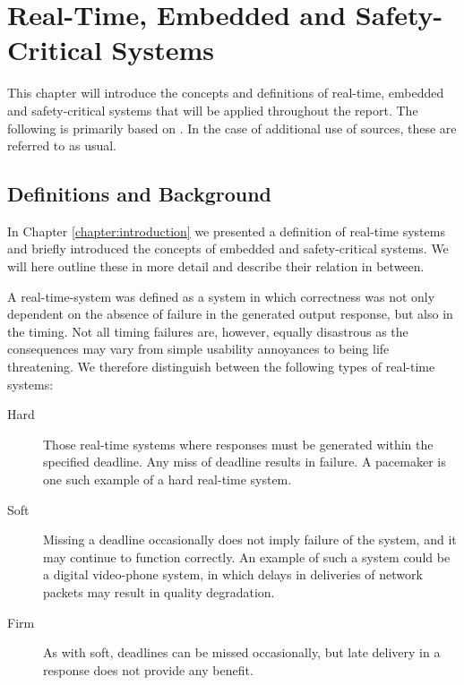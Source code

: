 \chapter{Real-Time, Embedded and Safety-Critical Systems}
\label{chapter:rts}
This chapter will introduce the concepts and definitions of real-time, embedded and safety-critical systems that will be applied throughout the report. The following is primarily based on \cite{alan2001real}. In the case of additional use of sources, these are referred to as usual.

\section{Definitions and Background} %
\label{sec:definitions_and_background}
In Chapter \ref{chapter:introduction} we presented a definition of real-time systems and briefly introduced the concepts of embedded and safety-critical systems. We will here outline these in more detail and describe their relation in between.

A real-time-system was defined as a system in which correctness was not only dependent on the absence of failure in the generated output response, but also in the timing. Not all timing failures are, however, equally disastrous as the consequences may vary from simple usability annoyances to being life threatening. We therefore distinguish between the following types of real-time systems:
\begin{description}
\item[Hard] Those real-time systems where responses must be generated within the specified deadline. Any miss of deadline results in failure. A pacemaker is one such example of a hard real-time system.
\item[Soft] Missing a deadline occasionally does not imply failure of the system, and it may continue to function correctly. An example of such a system could be a digital video-phone system, in which delays in deliveries of network packets may result in quality degradation.
\item[Firm] As with soft, deadlines can be missed occasionally, but late delivery in a response does not provide any benefit. 
\end{description}

